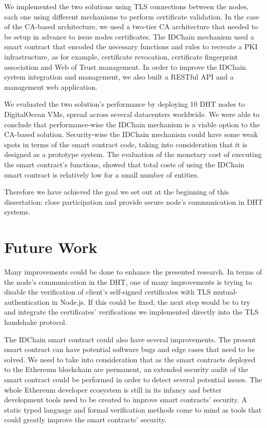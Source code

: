 We implemented the two solutions using TLS connections between the nodes, each one using different mechanisms to perform certificate validation.
In the case of the CA-based architecture, we used a two-tier CA architecture that needed to be setup in advance to issue nodes certificates.
The IDChain mechanism used a smart contract that encoded the necessary functions and rules to recreate a \ac{PKI} infrastructure, as for example, certificate revocation, certificate fingerprint association and Web of Trust management.
In order to improve the IDChain system integration and management, we also built a RESTful API and a management web application.

We evaluated the two solution's performance by deploying 10 DHT nodes to DigitalOcean \acp{VM}, spread across several datacenters worldwide.
We were able to conclude that performance-wise the IDChain mechanism is a viable option to the CA-based solution.
Security-wise the IDChain mechanism could have some weak spots in terms of the smart contract code, taking into consideration that it is designed as a prototype system.
The evaluation of the monetary cost of executing the smart contract's functions, showed that total costs of using the IDChain smart contract is relatively low for a small number of entities.

Therefore we have achieved the goal we set out at the beginning of this dissertation: close participation and provide secure node's communication in DHT systems.

\section{Future Work}
\label{section:future}

Many improvements could be done to enhance the presented research.
In terms of the node's communication in the DHT, one of many improvements is trying to disable the verification of client's self-signed certificates with TLS mutual-authentication in Node.js.
If this could be fixed, the next step would be to try and integrate the certificates' verifications we implemented directly into the TLS handshake protocol.

The IDChain smart contract could also have several improvements.
The present smart contract can have potential software bugs and edge cases that need to be solved.
We need to take into consideration that as the smart contracts deployed to the Ethereum blockchain are permanent, an extended security audit of the smart contract could be performed in order to detect several potential issues.
The whole Ethereum developer ecosystem is still in its infancy and better development tools need to be created to improve smart contracts' security.
A static typed language and formal verification methods come to mind as tools that could greatly improve the smart contracts' security.

